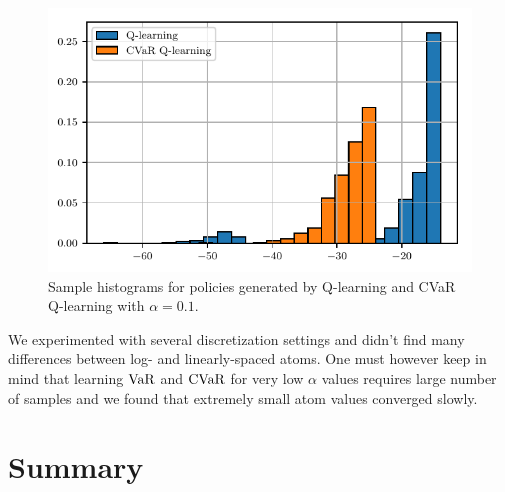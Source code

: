\begin{figure}[h]
\center
\includegraphics[width=0.6\linewidth]{gfx/sample_hist.pdf}
\caption{Sample histograms for policies generated by Q-learning and CVaR Q-learning with $\alpha=0.1$.}
\label{fig:qhist}
\end{figure}

We experimented with several discretization settings and didn't find many differences between log- and linearly-spaced atoms. One must however keep in mind that learning $\text{VaR}$ and $\text{CVaR}$ for very low $\alpha$ values requires large number of samples and we found that extremely small atom values converged slowly.

\section{Summary}



